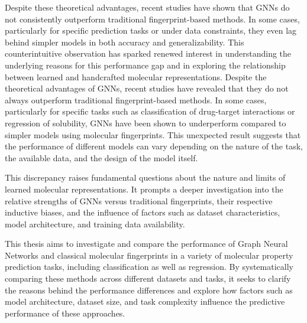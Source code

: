 Despite these theoretical advantages, recent studies have shown that GNNs do not consistently outperform traditional fingerprint-based methods. In some cases, particularly for specific prediction tasks or under data constraints, they even lag behind simpler models in both accuracy and generalizability. This counterintuitive observation has sparked renewed interest in understanding the underlying reasons for this performance gap and in exploring the relationship between learned and handcrafted molecular representations.
Despite the theoretical advantages of GNNs, recent studies have revealed that they do not always outperform traditional fingerprint-based methods. In some cases, particularly for specific tasks such as classification of drug-target interactions or regression of solubility, GNNs have been shown to underperform compared to simpler models using molecular fingerprints. This unexpected result suggests that the performance of different models can vary depending on the nature of the task, the available data, and the design of the model itself.

This discrepancy raises fundamental questions about the nature and limits of learned molecular representations. 
It prompts a deeper investigation into the relative strengths of GNNs versus traditional fingerprints, their respective inductive biases, and the influence of factors such as dataset characteristics, model architecture, and training data availability.

This thesis aims to investigate and compare the performance of Graph Neural Networks and classical molecular fingerprints in a variety of molecular property prediction tasks, including classification as well as regression. By systematically comparing these methods across different datasets and tasks, it seeks to clarify the reasons behind the performance differences and explore how factors such as model architecture, dataset size, and task complexity influence the predictive performance of these approaches.

